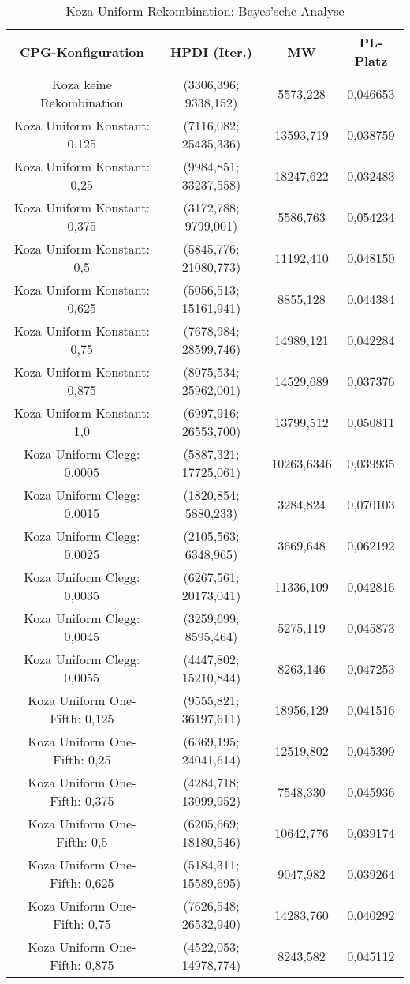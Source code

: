 \begin{table}[H]
	\centering
	\begin{tabular}{c | c | c | c}
		\textbf{CPG-Konfiguration} & \textbf{HPDI (Iter.)} & \textbf{MW} & \textbf{PL-Platz}\\
		\hline
		Koza keine Rekombination & (3306,396; 9338,152) & 5573,228 & 0,046653\\
		\hline
		Koza Uniform Konstant: 0,125 & (7116,082; 25435,336) & 13593,719 & 0,038759\\
		\hline
		Koza Uniform Konstant: 0,25 & (9984,851; 33237,558) & 18247,622 & 0,032483\\
		\hline
		Koza Uniform Konstant: 0,375 & (3172,788; 9799,001) & 5586,763 & 0,054234\\
		\hline
		Koza Uniform Konstant: 0,5 & (5845,776; 21080,773) & 11192,410 & 0,048150\\
		\hline
		Koza Uniform Konstant: 0,625 & (5056,513; 15161,941) & 8855,128 & 0,044384\\
		\hline
		Koza Uniform Konstant: 0,75 & (7678,984; 28599,746) & 14989,121 & 0,042284\\
		\hline
		Koza Uniform Konstant: 0,875 & (8075,534; 25962,001) & 14529,689 & 0,037376\\
		\hline
		Koza Uniform Konstant: 1,0 & (6997,916; 26553,700) & 13799,512 & 0,050811\\
		\hline
		Koza Uniform Clegg: 0,0005 & (5887,321; 17725,061) & 10263,6346 & 0,039935\\
		\hline
		Koza Uniform Clegg: 0,0015 & (1820,854; 5880,233) & 3284,824 & 0,070103\\
		\hline
		Koza Uniform Clegg: 0,0025 & (2105,563; 6348,965) & 3669,648 & 0,062192\\
		\hline
		Koza Uniform Clegg: 0,0035 & (6267,561; 20173,041) & 11336,109 & 0,042816\\
		\hline
		Koza Uniform Clegg: 0,0045 & (3259,699; 8595,464) & 5275,119 & 0,045873\\
		\hline
		Koza Uniform Clegg: 0,0055 & (4447,802; 15210,844) & 8263,146 & 0,047253\\
		\hline
		Koza Uniform One-Fifth: 0,125 & (9555,821; 36197,611) & 18956,129 & 0,041516\\
		\hline
		Koza Uniform One-Fifth: 0,25 & (6369,195; 24041,614) & 12519,802 & 0,045399\\
		\hline
		Koza Uniform One-Fifth: 0,375 & (4284,718; 13099,952) & 7548,330 & 0,045936\\
		\hline
		Koza Uniform One-Fifth: 0,5 & (6205,669; 18180,546) & 10642,776 & 0,039174\\
		\hline
		Koza Uniform One-Fifth: 0,625 & (5184,311; 15589,695) & 9047,982 & 0,039264\\
		\hline
		Koza Uniform One-Fifth: 0,75 & (7626,548; 26532,940) & 14283,760 & 0,040292\\
		\hline
		Koza Uniform One-Fifth: 0,875 & (4522,053; 14978,774) & 8243,582 & 0,045112\\
	\end{tabular}
	\label{table:kozaUniformBayesian}
	\caption{Koza Uniform Rekombination: Bayes'sche Analyse}
\end{table}

